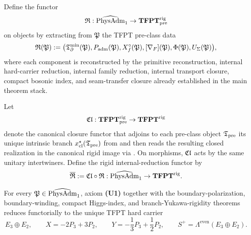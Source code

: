 \begin{definition}
\label{def:universal-reduction}
Define the functor
\[
\mathfrak R:\widehat{\mathrm{PhysAdm}}_1\to \mathbf{TFPT}^{\mathrm{rig}}_{\mathrm{pre}}
\]
on objects by extracting from $\mathfrak P$ the TFPT pre-class data
\[
\mathfrak R(\mathfrak P):=
\bigl(
    \mathfrak T_{\partial}^{\min}(\mathfrak P),
P_{\mathrm{adm}}(\mathfrak P),
X_f^\circ(\mathfrak P),
[\nabla_F](\mathfrak P),
\Phi(\mathfrak P),
U_\Sigma(\mathfrak P)
\bigr),
\]
where each component is reconstructed by the primitive reconstruction, internal hard-carrier
reduction, internal family reduction, internal transport closure, compact bosonic index, and
seam-transfer closure already
established in the main theorem stack.
\end{definition}

\begin{definition}
\label{def:rigid-closure-functor}
Let
\[
\mathfrak{Cl}:\mathbf{TFPT}^{\mathrm{rig}}_{\mathrm{pre}}\to \mathbf{TFPT}^{\mathrm{rig}}
\]
denote the canonical closure functor that adjoins to each pre-class object $\mathfrak T_{\mathrm{pre}}$ its unique
intrinsic branch $x_{\mathrm{cl}}^\star(\mathfrak T_{\mathrm{pre}})$ from  and then reads
the resulting closed realization in the canonical rigid image via
. On morphisms,
$\mathfrak{Cl}$ acts by the same unitary intertwiners. Define the rigid internal-reduction functor by
\[
\overline{\mathfrak R}:=\mathfrak{Cl}\circ \mathfrak R:\widehat{\mathrm{PhysAdm}}_1\to \mathbf{TFPT}^{\mathrm{rig}}.
\]
\end{definition}

\begin{theorem}
\label{prop:universal-carrier-reduction}
For every $\mathfrak P\in\widehat{\mathrm{PhysAdm}}_1$, axiom \textbf{(U1)} together with the boundary-polarization,
boundary-winding, compact Higgs-index, and branch-Yukawa-rigidity theorems reduces functorially to
the unique TFPT hard carrier
\[
E_3\oplus E_2,
\qquad
X=-2P_3+3P_2,
\qquad
Y=-\frac13P_3+\frac12P_2,
\qquad
S^+=\Lambda^{\mathrm{even}}(E_3\oplus E_2).
\]
\end{theorem}

